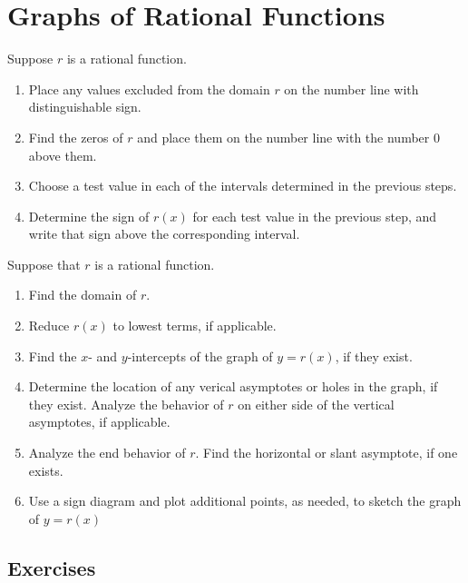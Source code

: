 \section{Graphs of Rational Functions}

\begin{procedure}
    Suppose $r$ is a rational function.
    \begin{enumerate}
        \item Place any values excluded from the domain $r$ on the number line with distinguishable sign.
        \item Find the zeros of $r$ and place them on the number line with the number 0 above them.
        \item Choose a test value in each of the intervals determined in the previous steps.
        \item Determine the sign of $r(x)$ for each test value in the previous step, and write that sign above the corresponding interval.
    \end{enumerate}
\end{procedure}

\begin{procedure}
    Suppose that $r$ is a rational function.
    \begin{enumerate}
        \item Find the domain of $r$.
        \item Reduce $r(x)$ to lowest terms, if applicable.
        \item Find the $x$- and $y$-intercepts of the graph of $y=r(x)$, if they exist.
        \item Determine the location of any verical asymptotes or holes in the graph, if they exist. Analyze the behavior of $r$ on either side of the vertical asymptotes, if applicable.
        \item Analyze the end behavior of $r$. Find the horizontal or slant asymptote, if one exists.
        \item Use a sign diagram and plot additional points, as needed, to sketch the graph of $y=r(x)$
    \end{enumerate}
\end{procedure}

\subsection{Exercises}
